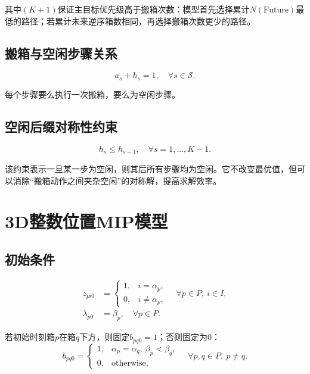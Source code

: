 \documentclass[11pt,a4paper]{ctexart}
\begin{document}
其中$(K+1)$保证主目标优先级高于搬箱次数：模型首先选择累计$N(\mathrm{Future})$最低的路径；若累计未来逆序箱数相同，再选择搬箱次数更少的路径。

\subsection{搬箱与空闲步骤关系}
\begin{equation}
a_s + h_s = 1, \quad \forall s\in\mathcal{S}.
\end{equation}

每个步骤要么执行一次搬箱，要么为空闲步骤。

\subsection{空闲后缀对称性约束}
\begin{equation}
h_s \le h_{s+1}, \quad \forall s=1,\ldots,K-1.
\end{equation}

该约束表示一旦某一步为空闲，则其后所有步骤均为空闲。它不改变最优值，但可以消除“搬箱动作之间夹杂空闲”的对称解，提高求解效率。

\section{3D整数位置MIP模型}

\subsection{初始条件}
\begin{align}
z_{pi0} &= 
\begin{cases}
1, & i=\alpha_p,\\
0, & i\ne \alpha_p,
\end{cases}
\quad \forall p\in P,\ i\in I,\\
\lambda_{p0} &= \beta_p,\quad \forall p\in P.
\end{align}

若初始时刻箱$p$在箱$q$下方，则固定$b_{pq0}=1$；否则固定为0：
\begin{equation}
b_{pq0} =
\begin{cases}
1, & \alpha_p=\alpha_q,\ \beta_p<\beta_q,\\
0, & \text{otherwise},
\end{cases}
\quad \forall p,q\in P,\ p\ne q.
\end{equation}
\end{document}

